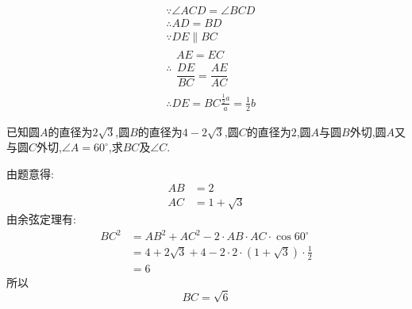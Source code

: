\begin{questions}
\begin{figure}[htbp]
	\end{figure}

	\begin{solution}
		\begin{align*}
			 & \because \angle{ACD} = \angle{BCD}                  \\
			 & \therefore AD = BD                                  \\
			 & \because DE \parallel BC                            \\
			 & \therefore
			\begin{array}{l}
				AE = EC \\
				\dfrac{DE}{BC} = \dfrac{AE}{AC}
			\end{array}                         \\
			 & \therefore DE = BC\frac{\frac{1}{2}a}{a} = \frac12b
		\end{align*}
	\end{solution}
	\pagebreak
	\question[10]
	已知圆$A$的直径为$2\sqrt{3}$,圆$B$的直径为$4-2\sqrt{3}$,圆$C$的直径为$2$,圆$A$与圆$B$外切,圆$A$又与圆$C$外切,$\angle{A}=60^\circ$,求$BC$及$\angle{C}$.

	\begin{figure*}[ht]
		\centering
	\end{figure*}

	\begin{solution}
		由题意得:
		\begin{align*}
			AB & = 2            \\
			AC & = 1 + \sqrt{3}
		\end{align*}
		由余弦定理有:
		\begin{align*}
			BC^2 & = AB^2 + AC^2 - 2\cdot AB \cdot AC \cdot \cos60^\circ           \\
			     & = 4 + 2\sqrt{3} + 4 - 2\cdot 2 \cdot (1+\sqrt{3}) \cdot \frac12 \\
			     & = 6
		\end{align*}
		所以
		\begin{equation*}
			BC = \sqrt{6}
		\end{equation*}


\end{solution}
\end{questions}
